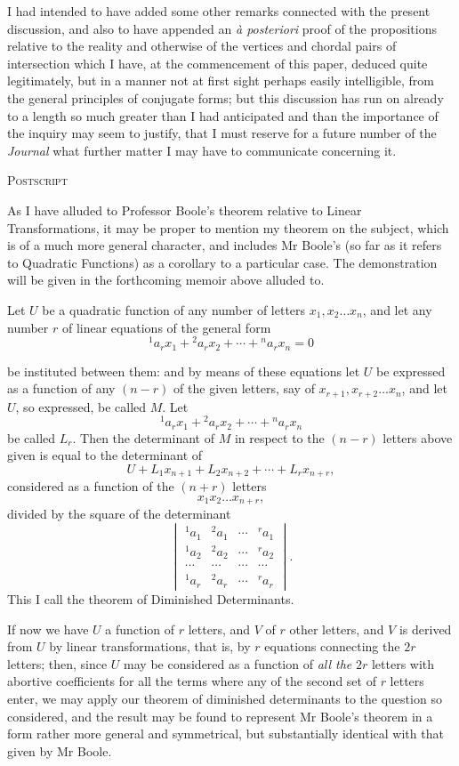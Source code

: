 \documentclass[11pt]{article}
\newcommand{\subpaperhead}[1]{\begin{center}{\large\scshape #1}\end{center}}
\newcommand{\sourcepage}[1]{\marginpar{\scriptsize p.~#1}}
\begin{document}
I had intended to have added some other remarks connected with the present discussion, and also to have appended an \emph{\`a posteriori} proof of the propositions relative to the reality and otherwise of the vertices and chordal pairs of intersection which I have, at the commencement of this paper, deduced quite legitimately, but in a manner not at first sight perhaps easily intelligible, from the general principles of conjugate forms; but this discussion has run on already to a length so much greater than I had anticipated and than the importance of the inquiry may seem to justify, that I must reserve for a future number of the \emph{Journal} what further matter I may have to communicate concerning it.

\subpaperhead{Postscript}

As I have alluded to Professor Boole's theorem relative to Linear Transformations, it may be proper to mention my theorem on the subject, which is of a much more general character, and includes Mr Boole's (so far as it refers to Quadratic Functions) as a corollary to a particular case. The demonstration will be given in the forthcoming memoir above alluded to.

Let $U$ be a quadratic function of any number of letters $x_1,x_2\ldots x_n$, and let any number $r$ of linear equations of the general form
\[
{}^{1}a_r x_1+{}^{2}a_r x_2+\cdots+{}^{n}a_r x_n=0
\]

\sourcepage{136}
be instituted between them: and by means of these equations let $U$ be expressed as a function of any $(n-r)$ of the given letters, say of $x_{r+1},x_{r+2}\ldots x_n$, and let $U$, so expressed, be called $M$. Let
\[
{}^{1}a_r x_1+{}^{2}a_r x_2+\cdots+{}^{n}a_r x_n
\]
be called $L_r$. Then the determinant of $M$ in respect to the $(n-r)$ letters above given is equal to the determinant of
\[
U+L_1x_{n+1}+L_2x_{n+2}+\cdots+L_rx_{n+r},
\]
considered as a function of the $(n+r)$ letters
\[
x_1x_2\ldots x_{n+r},
\]
divided by the square of the determinant
\[
\begin{vmatrix}
{}^{1}a_1&{}^{2}a_1&\cdots&{}^{r}a_1\\
{}^{1}a_2&{}^{2}a_2&\cdots&{}^{r}a_2\\
\cdots&\cdots&\cdots&\cdots\\
{}^{1}a_r&{}^{2}a_r&\cdots&{}^{r}a_r
\end{vmatrix}.
\]
This I call the theorem of Diminished Determinants.

If now we have $U$ a function of $r$ letters, and $V$ of $r$ other letters, and $V$ is derived from $U$ by linear transformations, that is, by $r$ equations connecting the $2r$ letters; then, since $U$ may be considered as a function of \emph{all the} $2r$ letters with abortive coefficients for all the terms where any of the second set of $r$ letters enter, we may apply our theorem of diminished determinants to the question so considered, and the result may be found to represent Mr Boole's theorem in a form rather more general and symmetrical, but substantially identical with that given by Mr Boole.
\end{document}
